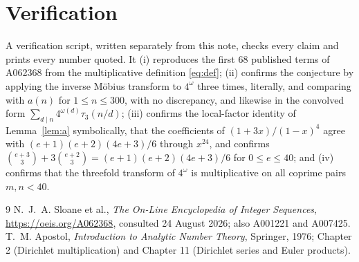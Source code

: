 \documentclass[11pt,a4paper]{article}
\theoremstyle{plain}
\theoremstyle{definition}
\begin{document}
\section{Verification}

A verification script, written separately from this note, checks every claim and prints
every number quoted. It (i) reproduces the first 68 published terms of A062368 from the
multiplicative definition \eqref{eq:def}; (ii) confirms the conjecture by applying the
inverse M\"obius transform to $4^{\omega}$ three times, literally, and comparing with
$a(n)$ for $1\le n\le300$, with no discrepancy, and likewise in the convolved form
$\sum_{d\mid n}4^{\omega(d)}\tau_{3}(n/d)$; (iii) confirms the local-factor identity of
Lemma~\ref{lem:a} symbolically, that the coefficients of $(1+3x)/(1-x)^{4}$ agree with
$(e+1)(e+2)(4e+3)/6$ through $x^{24}$, and confirms
$\binom{e+3}{3}+3\binom{e+2}{3}=(e+1)(e+2)(4e+3)/6$ for $0\le e\le40$; and (iv) confirms
that the threefold transform of $4^{\omega}$ is multiplicative on all coprime pairs
$m,n<40$.

\begin{thebibliography}{9}
 N.~J.~A. Sloane et al., \emph{The On-Line Encyclopedia of Integer
Sequences}, \url{https://oeis.org/A062368}, consulted 24 August 2026; also A001221 and
A007425.
 T.~M. Apostol, \emph{Introduction to Analytic Number Theory}, Springer,
1976; Chapter 2 (Dirichlet multiplication) and Chapter 11 (Dirichlet series and Euler
products).
\end{thebibliography}
\end{document}
